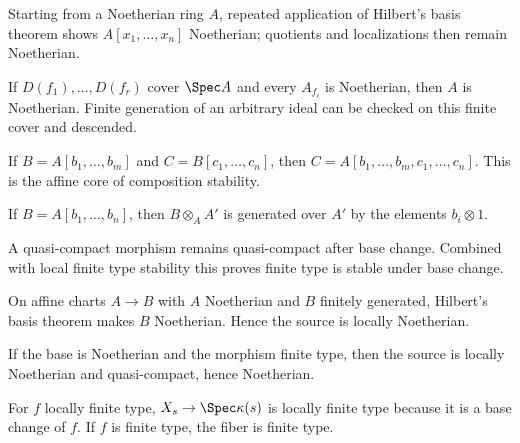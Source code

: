 \begin{example}\label{ex:vi26-a01}
Starting from a Noetherian ring $A$, repeated application of Hilbert's basis theorem shows $A[x_1,\dots,x_n]$ Noetherian; quotients and localizations then remain Noetherian.
\end{example}

\begin{example}\label{ex:vi26-a02}
If $D(f_1),\dots,D(f_r)$ cover $\Spec A$ and every $A_{f_i}$ is Noetherian, then $A$ is Noetherian.  Finite generation of an arbitrary ideal can be checked on this finite cover and descended.
\end{example}

\begin{example}\label{ex:vi26-a03}
If $B=A[b_1,\dots,b_m]$ and $C=B[c_1,\dots,c_n]$, then $C=A[b_1,\dots,b_m,c_1,\dots,c_n]$.  This is the affine core of composition stability.
\end{example}

\begin{example}\label{ex:vi26-a04}
If $B=A[b_1,\dots,b_n]$, then $B\otimes_AA'$ is generated over $A'$ by the elements $b_i\otimes1$.
\end{example}

\begin{example}\label{ex:vi26-a05}
A quasi-compact morphism remains quasi-compact after base change.  Combined with local finite type stability this proves finite type is stable under base change.
\end{example}

\begin{example}\label{ex:vi26-a06}
On affine charts $A\to B$ with $A$ Noetherian and $B$ finitely generated, Hilbert's basis theorem makes $B$ Noetherian.  Hence the source is locally Noetherian.
\end{example}

\begin{example}\label{ex:vi26-a07}
If the base is Noetherian and the morphism finite type, then the source is locally Noetherian and quasi-compact, hence Noetherian.
\end{example}

\begin{example}\label{ex:vi26-a08}
For $f$ locally finite type, $X_s\to\Spec\kappa(s)$ is locally finite type because it is a base change of $f$.  If $f$ is finite type, the fiber is finite type.
\end{example}

